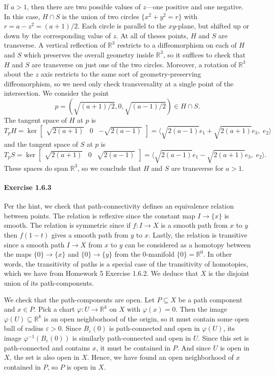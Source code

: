 \documentclass[12pt]{article}
\newcommand{\pnum}[1]{\paragraph{#1}}
\theoremstyle{definition}
\newcommand{\R}{\mathbb{R}}
\newcommand{\eps}{\varepsilon}
\renewcommand{\phi}{\varphi}
\newcommand{\<}{\langle}
\renewcommand{\>}{\rangle}
\newcommand{\seq}{\subseteq}
\newcommand{\mat}[1]{\begin{bmatrix}#1\end{bmatrix}}
\begin{document}
If $a > 1$, then there are two possible values of $z$---one positive and one negative.
In this case, $H \cap S$ is the union of two circles $\{x^2 + y^2 = r\}$ with $r = a - z^2 =(a + 1)/2$.
Each circle is parallel to the $xy$-plane, but shifted up or down by the corresponding value of $z$.
At all of theses points, $H$ and $S$ are transverse.
A vertical reflection of $\R^3$ restricts to a diffeomorphism on each of $H$ and $S$ which preserves the overall geometry inside $\R^3$, so it suffices to check that $H$ and $S$ are transverse on just one of the two circles.
Moreover, a rotation of $\R^3$ about the $z$ axis restricts to the same sort of geometry-preserving diffeomorphism, so we need only check transversality at a single point of the intersection.
We consider the point
\[
    p = (\sqrt{(a + 1)/2}, 0, \sqrt{(a - 1)/2}) \in H \cap S.
\]
The tangent space of $H$ at $p$ is
\[
    T_p H
        = \ker \mat{\sqrt{2(a + 1)} & 0 & -\sqrt{2(a - 1)}}
        = \<\sqrt{2(a - 1)}e_1 + \sqrt{2(a + 1)}e_3,\; e_2\>
\]
and the tangent space of $S$ at $p$ is
\[
    T_p S
        = \ker \mat{\sqrt{2(a + 1)} & 0 & \sqrt{2(a - 1)}}
        = \<\sqrt{2(a - 1)}e_1 - \sqrt{2(a + 1)}e_3,\; e_2\>.
\]
These spaces do span $\R^3$, so we conclude that $H$ and $S$ are transverse for $a > 1$.




\pnum{Exercise 1.6.3}

Per the hint, we check that path-connectivity defines an equivalence relation between points.
The relation is reflexive since the constant map $I \to \{x\}$ is smooth.
The relation is symmetric since if $f : I \to X$ is a smooth path from $x$ to $y$ then $f(1 - t)$ gives a smooth path from $y$ to $x$.
Lastly, the relation is transitive since a smooth path $I \to X$ from $x$ to $y$ can be considered as a homotopy between the maps $\{0\} \to \{x\}$ and $\{0\} \to \{y\}$ from the $0$-manifold $\{0\} = \R^0$.
In other words, the transitivity of paths is a special case of the transitivity of homotopies, which we have from Homework 5 Exercise 1.6.2.
We deduce that $X$ is the disjoint union of its path-components.

We check that the path-components are open.
Let $P \seq X$ be a path component and $x \in P$.
Pick a chart $\phi : U \to \R^k$ on $X$ with $\phi(x) = 0$.
Then the image $\phi(U) \seq \R^k$ is an open neighborhood of the origin, so it must contain some open ball of radius $\eps > 0$.
Since $B_\eps(0)$ is path-connected and open in $\phi(U)$, its image $\phi^{-1}(B_\eps(0))$ is similarly path-connected and open in $U$.
Since this set is path-connected and contains $x$, it must be contained in $P$.
And since $U$ is open in $X$, the set is also open in $X$.
Hence, we have found an open neighborhood of $x$ contained in $P$, so $P$ is open in $X$.
\end{document}
